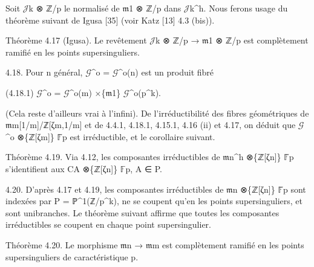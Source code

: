 \documentclass[11pt,a4paper]{article}
\begin{document}
Soit \ensuremath{\mathcal{J}}\textunderscore{}k ⊗ ℤ/p le normalisé de \ensuremath{\mathfrak{m}}\textunderscore{}1 ⊗ ℤ/p dans \ensuremath{\mathcal{J}}\textunderscore{}k\textasciicircum{}h. Nous ferons usage du théorème suivant de Igusa [35] (voir Katz [13] 4.3 (bis)).

Théorème 4.17 (Igusa). Le revêtement \ensuremath{\mathcal{J}}\textunderscore{}k ⊗ ℤ/p → \ensuremath{\mathfrak{m}}\textunderscore{}1 ⊗ ℤ/p est complètement ramifié en les points supersinguliers.

4.18. Pour n général, \ensuremath{\mathcal{G}}\textasciicircum{}o = \ensuremath{\mathcal{G}}\textasciicircum{}o(n) est un produit fibré

(4.18.1)        \ensuremath{\mathcal{G}}\textasciicircum{}o = \ensuremath{\mathcal{G}}\textasciicircum{}o(m) ×\textunderscore{}\{\ensuremath{\mathfrak{m}}\textunderscore{}1\} \ensuremath{\mathcal{G}}\textasciicircum{}o(p\textasciicircum{}k).

(Cela reste d'ailleurs vrai à l'infini). De l'irréductibilité des fibres géométriques de \ensuremath{\mathfrak{m}}\textunderscore{}m[1/m]/ℤ[ζ\textunderscore{}m,1/m] et de 4.4.1, 4.18.1, 4.15.1, 4.16 (ii) et 4.17, on déduit que \ensuremath{\mathcal{G}}\textasciicircum{}o ⊗\textunderscore{}\{ℤ[ζ\textunderscore{}m]\} \ensuremath{\mathbb{F}}̄\textunderscore{}p est irréductible, et le corollaire suivant.

Théorème 4.19. Via 4.12, les composantes irréductibles de \ensuremath{\mathfrak{m}}\textunderscore{}n\textasciicircum{}h ⊗\textunderscore{}\{ℤ[ζ\textunderscore{}n]\} \ensuremath{\mathbb{F}}̄\textunderscore{}p s'identifient aux C\textunderscore{}A ⊗\textunderscore{}\{ℤ[ζ\textunderscore{}n]\} \ensuremath{\mathbb{F}}\textunderscore{}p, A ∈ P.

4.20. D'après 4.17 et 4.19, les composantes irréductibles de \ensuremath{\mathfrak{m}}\textunderscore{}n ⊗\textunderscore{}\{ℤ[ζ\textunderscore{}n]\} \ensuremath{\mathbb{F}}̄\textunderscore{}p sont indexées par P = ℙ\textasciicircum{}1(ℤ/p\textasciicircum{}k), ne se coupent qu'en les points supersinguliers, et sont unibranches. Le théorème suivant affirme que toutes les composantes irréductibles se coupent en chaque point supersingulier.

Théorème 4.20. Le morphisme \ensuremath{\mathfrak{m}}\textunderscore{}n → \ensuremath{\mathfrak{m}}\textunderscore{}m est complètement ramifié en les points supersinguliers de caractéristique p.
\end{document}
